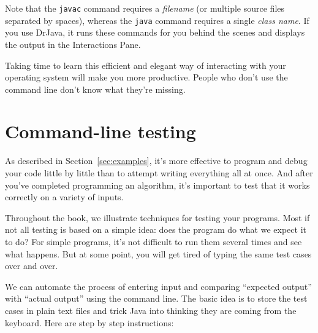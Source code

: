 \documentclass[12pt]{book}
\theoremstyle{exercise}
\begin{document}
Note that the {\tt javac} command requires a {\em filename} (or multiple source files separated by spaces), whereas the {\tt java} command requires a single {\em class name}.
If you use DrJava, it runs these commands for you behind the scenes and displays the output in the Interactions Pane.

Taking time to learn this efficient and elegant way of interacting with your operating system will make you more productive.
People who don't use the command line don't know what they're missing.


\section{Command-line testing}
\label{cltesting}

As described in Section~\ref{sec:examples}, it's more effective to program and debug your code little by little than to attempt writing everything all at once.
And after you've completed programming an algorithm, it's important to test that it works correctly on a variety of inputs.

Throughout the book, we illustrate techniques for testing your programs.
Most if not all testing is based on a simple idea: does the program do what we expect it to do?
For simple programs, it's not difficult to run them several times and see what happens.
But at some point, you will get tired of typing the same test cases over and over.

We can automate the process of entering input and comparing ``expected output'' with ``actual output'' using the command line.
The basic idea is to store the test cases in plain text files and trick Java into thinking they are coming from the keyboard.
Here are step by step instructions:
\end{document}
